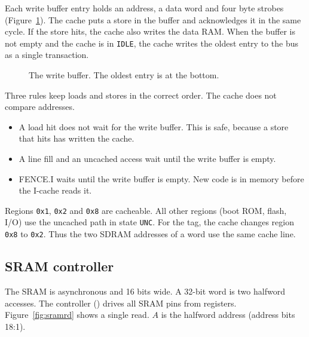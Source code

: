 Each write buffer entry holds an address, a data word and four byte strobes (Figure~\ref{fig:wbuf}). The cache puts a store in the buffer and acknowledges it in the same cycle. If the store hits, the cache also writes the data RAM. When the buffer is not empty and the cache is in \texttt{IDLE}, the cache writes the oldest entry to the bus as a single transaction.

\begin{figure}[H]
  \centering
  \caption{The write buffer. The oldest entry is at the bottom.}
  \label{fig:wbuf}
\end{figure}

Three rules keep loads and stores in the correct order. The cache does not compare addresses.

\begin{itemize}
  \item A load hit does not wait for the write buffer. This is safe, because a store that hits has written the cache.
  \item A line fill and an uncached access wait until the write buffer is empty.
  \item FENCE.I waits until the write buffer is empty. New code is in memory before the I-cache reads it.
\end{itemize}

Regions \texttt{0x1}, \texttt{0x2} and \texttt{0x8} are cacheable. All other regions (boot ROM, flash, I/O) use the uncached path in state \texttt{UNC}. For the tag, the cache changes region \texttt{0x8} to \texttt{0x2}. Thus the two SDRAM addresses of a word use the same cache line.

\subsection{SRAM controller}

The SRAM is asynchronous and 16 bits wide. A 32-bit word is two halfword accesses. The controller () drives all SRAM pins from registers. Figure~\ref{fig:sramrd} shows a single read. $A$ is the halfword address (address bits 18:1).

